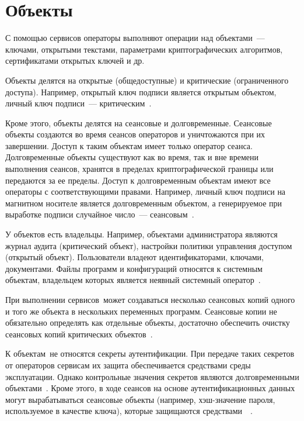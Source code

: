 \section{Объекты}

С помощью сервисов операторы выполняют операции над объектами~---
ключами, открытыми текстами, параметрами криптографических алгоритмов,
сертификатами открытых ключей и др.

Объекты делятся на открытые (общедоступные) 
и критические (ограниченного доступа).
%
Например, открытый ключ подписи является открытым объектом,
личный ключ подписи~--- критическим~.

Кроме этого, объекты делятся на сеансовые и долговременные.
Сеансовые объекты создаются во время сеансов операторов и уничтожаются
при их завершении. 
Доступ к таким объектам имеет только оператор сеанса.
Долговременные объекты существуют как во время, 
так и вне времени выполнения сеансов, 
хранятся в пределах криптографической границы
или передаются за ее пределы.
Доступ к долговременным объектам имеют все операторы 
с соответствующими правами.
Например, личный ключ подписи на магнитном носителе является 
долговременным объектом, а генерируемое при выработке подписи 
случайное число~--- сеансовым~.

У объектов есть владельцы.
Например, объектами администратора 
являются журнал аудита (критический объект),
настройки политики управления доступом (открытый объект).
%
Пользователи владеют идентификаторами, ключами, документами.
Файлы программ и конфигураций относятся к системным объектам,
владельцем которых является неявный системный оператор~.

При выполнении сервисов~\TOE может создаваться несколько
сеансовых копий одного и того же объекта 
в нескольких переменных программ. 
Сеансовые копии не обязательно определять как отдельные объекты,
достаточно обеспечить очистку сеансовых копий 
критических объектов~.

К объектам~\TOE не относятся секреты аутентификации. 
При передаче таких секретов от операторов 
сервисам их защита обеспечивается средствами среды эксплуатации. 
Однако контрольные значения секретов являются долговременными объектами~\TOE. 
Кроме этого, в ходе сеансов на основе аутентификационных данных могут 
вырабатываться сеансовые объекты (например, хэш-значение пароля, 
используемое в качестве ключа), которые защищаются 
средствами~\TOE~.

